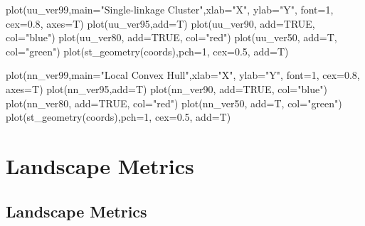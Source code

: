 \documentclass[
  letterpaper,
]{book}
\newenvironment{Shaded}{\begin{snugshade}}{\end{snugshade}}
\newcommand{\AttributeTok}[1]{\textcolor[rgb]{0.40,0.45,0.13}{#1}}
\newcommand{\ConstantTok}[1]{\textcolor[rgb]{0.56,0.35,0.01}{#1}}
\newcommand{\DecValTok}[1]{\textcolor[rgb]{0.68,0.00,0.00}{#1}}
\newcommand{\FloatTok}[1]{\textcolor[rgb]{0.68,0.00,0.00}{#1}}
\newcommand{\FunctionTok}[1]{\textcolor[rgb]{0.28,0.35,0.67}{#1}}
\newcommand{\NormalTok}[1]{\textcolor[rgb]{0.00,0.23,0.31}{#1}}
\newcommand{\StringTok}[1]{\textcolor[rgb]{0.13,0.47,0.30}{#1}}
\begin{document}
\begin{Shaded}
\begin{Highlighting}[]
\FunctionTok{plot}\NormalTok{(uu\_ver99,}\AttributeTok{main=}\StringTok{"Single{-}linkage Cluster"}\NormalTok{,}\AttributeTok{xlab=}\StringTok{"X"}\NormalTok{, }\AttributeTok{ylab=}\StringTok{"Y"}\NormalTok{, }\AttributeTok{font=}\DecValTok{1}\NormalTok{, }\AttributeTok{cex=}\FloatTok{0.8}\NormalTok{, }\AttributeTok{axes=}\NormalTok{T)}
\FunctionTok{plot}\NormalTok{(uu\_ver95,}\AttributeTok{add=}\NormalTok{T)}
\FunctionTok{plot}\NormalTok{(uu\_ver90, }\AttributeTok{add=}\ConstantTok{TRUE}\NormalTok{, }\AttributeTok{col=}\StringTok{"blue"}\NormalTok{)}
\FunctionTok{plot}\NormalTok{(uu\_ver80, }\AttributeTok{add=}\ConstantTok{TRUE}\NormalTok{, }\AttributeTok{col=}\StringTok{"red"}\NormalTok{)}
\FunctionTok{plot}\NormalTok{(uu\_ver50, }\AttributeTok{add=}\NormalTok{T, }\AttributeTok{col=}\StringTok{"green"}\NormalTok{)}
\FunctionTok{plot}\NormalTok{(}\FunctionTok{st\_geometry}\NormalTok{(coords),}\AttributeTok{pch=}\DecValTok{1}\NormalTok{, }\AttributeTok{cex=}\FloatTok{0.5}\NormalTok{, }\AttributeTok{add=}\NormalTok{T)}

\FunctionTok{plot}\NormalTok{(nn\_ver99,}\AttributeTok{main=}\StringTok{"Local Convex Hull"}\NormalTok{,}\AttributeTok{xlab=}\StringTok{"X"}\NormalTok{, }\AttributeTok{ylab=}\StringTok{"Y"}\NormalTok{, }\AttributeTok{font=}\DecValTok{1}\NormalTok{, }\AttributeTok{cex=}\FloatTok{0.8}\NormalTok{, }\AttributeTok{axes=}\NormalTok{T)}
\FunctionTok{plot}\NormalTok{(nn\_ver95,}\AttributeTok{add=}\NormalTok{T)}
\FunctionTok{plot}\NormalTok{(nn\_ver90, }\AttributeTok{add=}\ConstantTok{TRUE}\NormalTok{, }\AttributeTok{col=}\StringTok{"blue"}\NormalTok{)}
\FunctionTok{plot}\NormalTok{(nn\_ver80, }\AttributeTok{add=}\ConstantTok{TRUE}\NormalTok{, }\AttributeTok{col=}\StringTok{"red"}\NormalTok{)}
\FunctionTok{plot}\NormalTok{(nn\_ver50, }\AttributeTok{add=}\NormalTok{T, }\AttributeTok{col=}\StringTok{"green"}\NormalTok{)}
\FunctionTok{plot}\NormalTok{(}\FunctionTok{st\_geometry}\NormalTok{(coords),}\AttributeTok{pch=}\DecValTok{1}\NormalTok{, }\AttributeTok{cex=}\FloatTok{0.5}\NormalTok{, }\AttributeTok{add=}\NormalTok{T)}
\end{Highlighting}
\end{Shaded}

\part{Landscape Metrics}

\hypertarget{landscape-metrics}{%
\chapter{Landscape Metrics}\label{landscape-metrics}}
\end{document}
